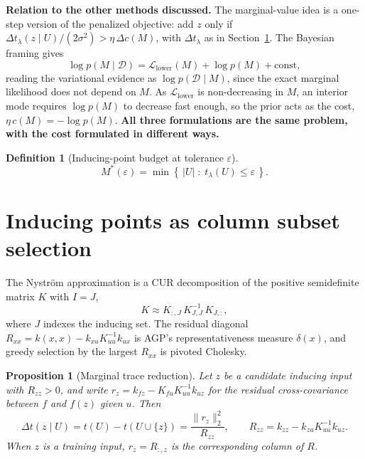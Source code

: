 \documentclass[11pt,a4paper]{article}
\newtheorem{proposition}{Proposition}
\theoremstyle{definition}
\newtheorem{definition}{Definition}
\theoremstyle{remark}
\begin{document}
\textbf{Relation to the other methods discussed.}
The marginal-value idea is a one-step version of the penalized objective: add $z$ only if $\Delta t_\lambda(z \mid U)/(2\sigma^2) > \eta\,\Delta c(M)$, with $\Delta t_\lambda$ as in Section~\ref{sec:css}. The Bayesian framing gives
\[
\log p(M \mid \mathcal{D}) = \mathcal{L}_{\mathrm{lower}}(M) + \log p(M) + \text{const},
\]
reading the variational evidence as $\log p(\mathcal{D} \mid M)$, since the exact marginal likelihood does not depend on $M$. As $\mathcal{L}_{\mathrm{lower}}$ is non-decreasing in $M$, an interior mode requires $\log p(M)$ to decrease fast enough, so the prior acts as the cost, $\eta\,c(M) = -\log p(M)$. \textbf{All three formulations are the same problem, with the cost formulated in different ways.}

\begin{definition}[Inducing-point budget at tolerance $\varepsilon$]
\[
M^*(\varepsilon) = \min\left\{\, |U| \;:\; t_\lambda(U) \leq \varepsilon \,\right\}.
\]
\end{definition}

\section{Inducing points as column subset selection}
\label{sec:css}

The Nyström approximation is a CUR decomposition of the positive semidefinite matrix $K$ with $I = J$,
\[
K \approx K_{:,J}\,K_{J,J}^{-1}\,K_{J,:},
\]
where $J$ indexes the inducing set. The residual diagonal $R_{xx} = k(x,x) - k_{xu}K_{uu}^{-1}k_{ux}$ is AGP's representativeness measure $\delta(x)$, and greedy selection by the largest $R_{xx}$ is pivoted Cholesky.

\begin{proposition}[Marginal trace reduction]
Let $z$ be a candidate inducing input with $R_{zz} > 0$, and write $r_z = k_{fz} - K_{fu}K_{uu}^{-1}k_{uz}$ for the residual cross-covariance between $f$ and $f(z)$ given $u$. Then
\[
\Delta t(z \mid U) = t(U) - t(U \cup \{z\}) = \frac{\|r_z\|_2^2}{R_{zz}}, \qquad R_{zz} = k_{zz} - k_{zu}K_{uu}^{-1}k_{uz}.
\]
When $z$ is a training input, $r_z = R_{:,z}$ is the corresponding column of $R$.
\end{proposition}
\end{document}
